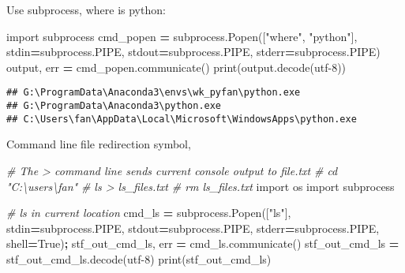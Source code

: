 \documentclass[
]{book}
\newenvironment{Shaded}{\begin{snugshade}}{\end{snugshade}}
\newcommand{\BuiltInTok}[1]{#1}
\newcommand{\CommentTok}[1]{\textcolor[rgb]{0.56,0.35,0.01}{\textit{#1}}}
\newcommand{\ImportTok}[1]{#1}
\newcommand{\NormalTok}[1]{#1}
\newcommand{\OperatorTok}[1]{\textcolor[rgb]{0.81,0.36,0.00}{\textbf{#1}}}
\newcommand{\StringTok}[1]{\textcolor[rgb]{0.31,0.60,0.02}{#1}}
\newcommand{\VariableTok}[1]{\textcolor[rgb]{0.00,0.00,0.00}{#1}}
\begin{document}
Use subprocess, where is python:

\begin{Shaded}
\begin{Highlighting}[]
\ImportTok{import}\NormalTok{ subprocess}
\NormalTok{cmd\_popen }\OperatorTok{=}\NormalTok{ subprocess.Popen([}\StringTok{"where"}\NormalTok{, }\StringTok{"python"}\NormalTok{],}
\NormalTok{                             stdin}\OperatorTok{=}\NormalTok{subprocess.PIPE,}
\NormalTok{                             stdout}\OperatorTok{=}\NormalTok{subprocess.PIPE,}
\NormalTok{                             stderr}\OperatorTok{=}\NormalTok{subprocess.PIPE)}
\NormalTok{output, err }\OperatorTok{=}\NormalTok{ cmd\_popen.communicate()}
\BuiltInTok{print}\NormalTok{(output.decode(}\StringTok{\textquotesingle{}utf{-}8\textquotesingle{}}\NormalTok{))}
\end{Highlighting}
\end{Shaded}

\begin{verbatim}
## G:\ProgramData\Anaconda3\envs\wk_pyfan\python.exe
## G:\ProgramData\Anaconda3\python.exe
## C:\Users\fan\AppData\Local\Microsoft\WindowsApps\python.exe
\end{verbatim}

Command line file redirection symbol,

\begin{Shaded}
\begin{Highlighting}[]
\CommentTok{\# The \textgreater{} command line sends current console output to file.txt}
\CommentTok{\# cd "C:\textbackslash{}users\textbackslash{}fan"}
\CommentTok{\# ls \textgreater{} ls\_files.txt}
\CommentTok{\# rm ls\_files.txt}
\ImportTok{import}\NormalTok{ os}
\ImportTok{import}\NormalTok{ subprocess}

\CommentTok{\# ls in current location}
\NormalTok{cmd\_ls }\OperatorTok{=}\NormalTok{ subprocess.Popen([}\StringTok{"ls"}\NormalTok{], stdin}\OperatorTok{=}\NormalTok{subprocess.PIPE, stdout}\OperatorTok{=}\NormalTok{subprocess.PIPE, stderr}\OperatorTok{=}\NormalTok{subprocess.PIPE, shell}\OperatorTok{=}\VariableTok{True}\NormalTok{)}\OperatorTok{;}
\NormalTok{stf\_out\_cmd\_ls, err }\OperatorTok{=}\NormalTok{ cmd\_ls.communicate()}
\NormalTok{stf\_out\_cmd\_ls }\OperatorTok{=}\NormalTok{ stf\_out\_cmd\_ls.decode(}\StringTok{\textquotesingle{}utf{-}8\textquotesingle{}}\NormalTok{)}
\BuiltInTok{print}\NormalTok{(stf\_out\_cmd\_ls)}
\end{Highlighting}
\end{Shaded}
\end{document}
